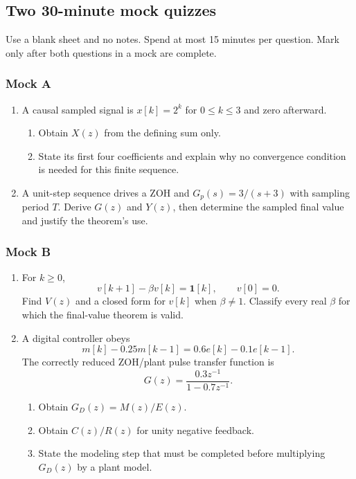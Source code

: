 \documentclass[11pt]{article}
\newcommand{\unitstep}{\mathbf{1}}
\begin{document}
\subsection{Two 30-minute mock quizzes}

Use a blank sheet and no notes.  Spend at most 15 minutes per question.  Mark only after both questions in a mock are complete.

\subsubsection*{Mock A}

\begin{enumerate}[label=\textbf{A\arabic*.},wide]
\item A causal sampled signal is $x[k]=2^k$ for $0\le k\le3$ and zero afterward.
  \begin{enumerate}[label=(\alph*)]
  \item Obtain $X(z)$ from the defining sum only.
  \item State its first four coefficients and explain why no convergence condition is needed for this finite sequence.
  \end{enumerate}

\item A unit-step sequence drives a ZOH and $G_p(s)=3/(s+3)$ with sampling period $T$.  Derive $G(z)$ and $Y(z)$, then determine the sampled final value and justify the theorem's use.
\end{enumerate}

\subsubsection*{Mock B}

\begin{enumerate}[label=\textbf{B\arabic*.},wide]
\item For $k\geq0$,
\[
v[k+1]-\beta v[k]=\unitstep[k],\qquad v[0]=0.
\]
Find $V(z)$ and a closed form for $v[k]$ when $\beta\ne1$.  Classify every real $\beta$ for which the final-value theorem is valid.

\item A digital controller obeys
\[
m[k]-0.25m[k-1]=0.6e[k]-0.1e[k-1].
\]
The correctly reduced ZOH/plant pulse transfer function is
\[
G(z)=\frac{0.3z^{-1}}{1-0.7z^{-1}}.
\]
  \begin{enumerate}[label=(\alph*)]
  \item Obtain $G_D(z)=M(z)/E(z)$.
  \item Obtain $C(z)/R(z)$ for unity negative feedback.
  \item State the modeling step that must be completed before multiplying $G_D(z)$ by a plant model.
  \end{enumerate}
\end{enumerate}
\end{document}
